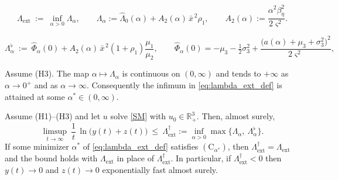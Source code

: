 \documentclass[10pt,a4paper]{amsart}
\newcommand{\Lext}{\Lambda_{\mathrm{ext}}}
\newcommand{\Lsharp}{\Lambda_{\mathrm{ext}}^{\dagger}}
\newcommand{\betaeta}{\beta_\eta}
\begin{document}
\begin{equation}\label{eq:lambda_ext_def}
\boxed{\ \Lext\ :=\ \inf_{\alpha>0}\Lambda_\alpha,\qquad \Lambda_\alpha:=\widehat\Lambda_0(\alpha)+A_2(\alpha)\,\bar x^{\,2}\rho_1,\qquad A_2(\alpha):=\frac{\alpha^2\betaeta^2}{2\varsigma^2}.\ }
\end{equation}

\begin{equation}\label{eq:Lflat}
\Lambda_\alpha^{\flat}\ :=\ \widehat\Phi_\alpha(0)+A_2(\alpha)\,\bar x^{\,2}(1+\rho_1)\frac{\mu_1}{\mu_2},\qquad
\widehat\Phi_\alpha(0)=-\mu_3-\tfrac12\sigma_3^2+\frac{\big(a(\alpha)+\mu_3+\sigma_3^2\big)^2}{2\varsigma^2},
\end{equation}

\begin{lemma}\label{lem:attain}
Assume (H3). The map $\alpha\mapsto\Lambda_\alpha$ is continuous on $(0,\infty)$ and tends to $+\infty$ as $\alpha\to0^+$ and as $\alpha\to\infty$. Consequently the infimum in \eqref{eq:lambda_ext_def} is attained at some $\alpha^\ast\in(0,\infty)$.
\end{lemma}

\begin{theorem}\label{Syz}
Assume (H1)--(H3) and let $u$ solve \eqref{SM} with $u_0\in\mathbb{R}^3_+$. Then, almost surely,
\begin{equation}\label{eq:main_extinction}
\limsup_{t\to\infty}\ \frac1t\,\ln\big(y(t)+z(t)\big)\ \le\ \Lsharp:=\inf_{\alpha>0}\max\big\{\Lambda_\alpha,\ \Lambda_\alpha^{\flat}\big\}.
\end{equation}
If some minimizer $\alpha^\ast$ of \eqref{eq:lambda_ext_def} satisfies $(\mathrm{C}_{\alpha^\ast})$, then $\Lsharp=\Lext$ and the bound holds with $\Lext$ in place of $\Lsharp$. In particular, if $\Lsharp<0$ then $y(t)\to0$ and $z(t)\to0$ exponentially fast almost surely.
\end{theorem}
\end{document}
